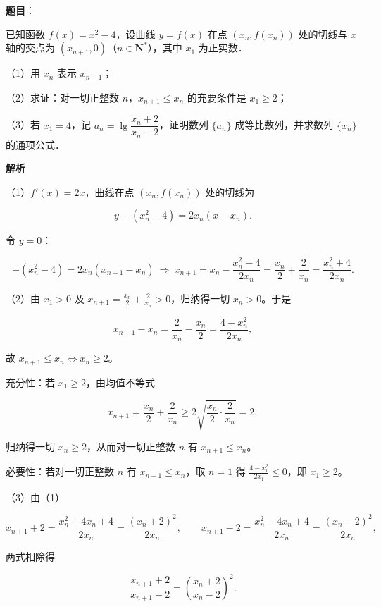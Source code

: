 \begin{answer}

\textbf{题目}：

已知函数 $f(x)=x^2-4$，设曲线 $y=f(x)$ 在点 $(x_n,f(x_n))$ 处的切线与 $x$ 轴的交点为 $(x_{n+1},0)$（$n\in\mathbf N^*$），其中 $x_1$ 为正实数．

（1）用 $x_n$ 表示 $x_{n+1}$；

（2）求证：对一切正整数 $n$，$x_{n+1}\leqslant x_n$ 的充要条件是 $x_1\geqslant2$；

（3）若 $x_1=4$，记 $a_n=\lg\dfrac{x_n+2}{x_n-2}$，证明数列 $\{a_n\}$ 成等比数列，并求数列 $\{x_n\}$ 的通项公式．

\textbf{解析}

（1）$f'(x)=2x$，曲线在点 $(x_n,f(x_n))$ 处的切线为

\nopagebreak[4]
\[y-\left(x_n^{2}-4\right)=2x_n(x-x_n).\]

令 $y=0$：

\nopagebreak[4]
\[-\left(x_n^{2}-4\right)=2x_n\left(x_{n+1}-x_n\right)\ \Longrightarrow\ x_{n+1}=x_n-\frac{x_n^{2}-4}{2x_n}=\frac{x_n}{2}+\frac{2}{x_n}=\frac{x_n^{2}+4}{2x_n}.\]

（2）由 $x_1>0$ 及 $x_{n+1}=\frac{x_n}{2}+\frac{2}{x_n}>0$，归纳得一切 $x_n>0$。于是

\nopagebreak[4]
\[x_{n+1}-x_n=\frac{2}{x_n}-\frac{x_n}{2}=\frac{4-x_n^{2}}{2x_n},\]

故 $x_{n+1}\leqslant x_n\iff x_n\geqslant2$。

充分性：若 $x_1\geqslant2$，由均值不等式

\nopagebreak[4]
\[x_{n+1}=\frac{x_n}{2}+\frac{2}{x_n}\geqslant2\sqrt{\frac{x_n}{2}\cdot\frac{2}{x_n}}=2,\]

归纳得一切 $x_n\geqslant2$，从而对一切正整数 $n$ 有 $x_{n+1}\leqslant x_n$。

必要性：若对一切正整数 $n$ 有 $x_{n+1}\leqslant x_n$，取 $n=1$ 得 $\frac{4-x_1^{2}}{2x_1}\leqslant0$，即 $x_1\geqslant2$。

（3）由（1）

\nopagebreak[4]
\[x_{n+1}+2=\frac{x_n^{2}+4x_n+4}{2x_n}=\frac{(x_n+2)^{2}}{2x_n},\qquad x_{n+1}-2=\frac{x_n^{2}-4x_n+4}{2x_n}=\frac{(x_n-2)^{2}}{2x_n},\]

两式相除得

\nopagebreak[4]
\[\frac{x_{n+1}+2}{x_{n+1}-2}=\left(\frac{x_n+2}{x_n-2}\right)^{2}.\]


\end{answer}
